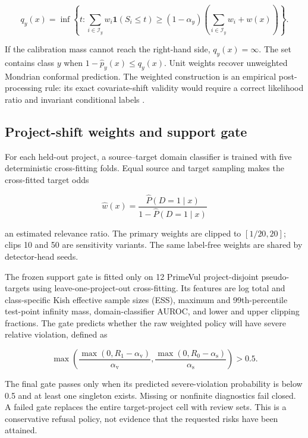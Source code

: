 \documentclass[research]{fcs}
\newcommand{\av}{\alpha_{\mathrm{v}}}
\newcommand{\as}{\alpha_{\mathrm{s}}}
\begin{document}
\begin{equation}
q_y(x)=\inf\left\{t:\sum_{i\in\mathcal I_y} w_i\mathbf 1(S_i\leq t)\geq(1-\alpha_y)\left(\sum_{i\in\mathcal I_y}w_i+w(x)\right)\right\}.
\label{eq:weighted}
\end{equation}

If the calibration mass cannot reach the right-hand side, $q_y(x)=\infty$. The set contains class $y$ when $1-\widehat p_y(x)\leq q_y(x)$. Unit weights recover unweighted Mondrian conformal prediction. The weighted construction is an empirical post-processing rule: its exact covariate-shift validity would require a correct likelihood ratio and invariant conditional labels \cite{tibshirani2019weightedcp}.

\subsection{Project-shift weights and support gate}

For each held-out project, a source--target domain classifier is trained with five deterministic cross-fitting folds. Equal source and target sampling makes the cross-fitted target odds

\begin{equation}
 \widehat w(x)=\frac{\widehat P(D=1\mid x)}{1-\widehat P(D=1\mid x)}
\end{equation}

an estimated relevance ratio. The primary weights are clipped to $[1/20,20]$; clips 10 and 50 are sensitivity variants. The same label-free weights are shared by detector-head seeds.

The frozen support gate is fitted only on 12 PrimeVul project-disjoint pseudo-targets using leave-one-project-out cross-fitting. Its features are log total and class-specific Kish effective sample sizes (ESS), maximum and 99th-percentile test-point infinity mass, domain-classifier AUROC, and lower and upper clipping fractions. The gate predicts whether the raw weighted policy will have severe relative violation, defined as

\begin{equation}
 \max\left(\frac{\max(0,R_1-\av)}{\av},\frac{\max(0,R_0-\as)}{\as}\right)>0.5.
\end{equation}

The final gate passes only when its predicted severe-violation probability is below 0.5 and at least one singleton exists. Missing or nonfinite diagnostics fail closed. A failed gate replaces the entire target-project cell with review sets. This is a conservative refusal policy, not evidence that the requested risks have been attained.
\end{document}
